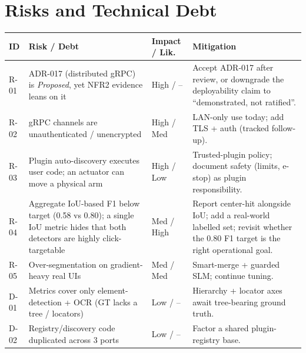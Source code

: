 \documentclass[11pt,a4paper]{report}
\begin{document}
\chapter{Risks and Technical Debt}
\begin{longtable}{@{}p{1.2cm}p{5.0cm}p{2.0cm}p{5.6cm}@{}}
\toprule
\textbf{ID} & \textbf{Risk / Debt} & \textbf{Impact / Lik.} & \textbf{Mitigation} \\
\midrule
\endhead
R-01 & ADR-017 (distributed gRPC) is \emph{Proposed}, yet NFR2 evidence leans on it & High / -- & Accept ADR-017 after review, or downgrade the deployability claim to ``demonstrated, not ratified''. \\
R-02 & gRPC channels are unauthenticated / unencrypted & High / Med & LAN-only use today; add TLS + auth (tracked follow-up). \\
R-03 & Plugin auto-discovery executes user code; an actuator can move a physical arm & High / Low & Trusted-plugin policy; document safety (limits, e-stop) as plugin responsibility. \\
R-04 & Aggregate IoU-based F1 below target (0.58 vs 0.80); a single IoU metric hides that both detectors are highly click-targetable & Med / High & Report center-hit alongside IoU; add a real-world labelled set; revisit whether the 0.80 F1 target is the right operational goal. \\
R-05 & Over-segmentation on gradient-heavy real UIs & Med / Med & Smart-merge + guarded SLM; continue tuning. \\
D-01 & Metrics cover only element-detection + OCR (GT lacks a tree / locators) & Low / -- & Hierarchy + locator axes await tree-bearing ground truth. \\
D-02 & Registry/discovery code duplicated across 3 ports & Low / -- & Factor a shared plugin-registry base. \\
\bottomrule
\end{longtable}
\end{document}
